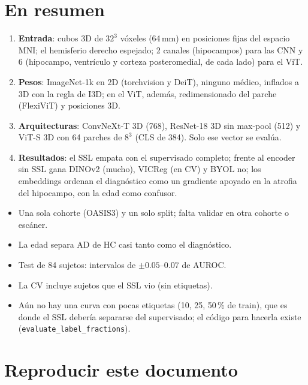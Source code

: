 \documentclass[11pt,a4paper]{article}
\begin{document}
\section{En resumen}

\begin{enumerate}[leftmargin=16pt]
\item \textbf{Entrada}: cubos 3D de $32^3$ vóxeles (64\,mm) en posiciones fijas del espacio MNI; el
  hemisferio derecho espejado; 2 canales (hipocampos) para las CNN y 6 (hipocampo, ventrículo y
  corteza posteromedial, de cada lado) para el ViT.
\item \textbf{Pesos}: ImageNet-1k en 2D (torchvision y DeiT), ninguno médico, inflados a 3D con la
  regla de I3D; en el ViT, además, redimensionado del parche (FlexiViT) y posiciones 3D.
\item \textbf{Arquitecturas}: ConvNeXt-T 3D (768), ResNet-18 3D sin max-pool (512) y ViT-S 3D con 64
  parches de $8^3$ (CLS de 384). Solo ese vector se evalúa.
\item \textbf{Resultados}: el SSL empata con el supervisado completo; frente al encoder sin SSL gana
  DINOv2 (mucho), VICReg (en CV) y BYOL no; los embeddings ordenan el diagnóstico como un gradiente
  apoyado en la atrofia del hipocampo, con la edad como confusor.
\end{enumerate}

\begin{warnbox}
\begin{itemize}[leftmargin=12pt]
\item Una sola cohorte (OASIS3) y un solo split; falta validar en otra cohorte o escáner.
\item La edad separa AD de HC casi tanto como el diagnóstico.
\item Test de 84 sujetos: intervalos de $\pm0.05$--$0.07$ de AUROC.
\item La CV incluye sujetos que el SSL vio (sin etiquetas).
\item Aún no hay una curva con pocas etiquetas (10, 25, 50\,\% de train), que es donde el SSL debería
  separarse del supervisado; el código para hacerla existe
  (\texttt{evaluate\_label\_fractions}).
\end{itemize}
\end{warnbox}

\appendix
\section{Reproducir este documento}
\end{document}
